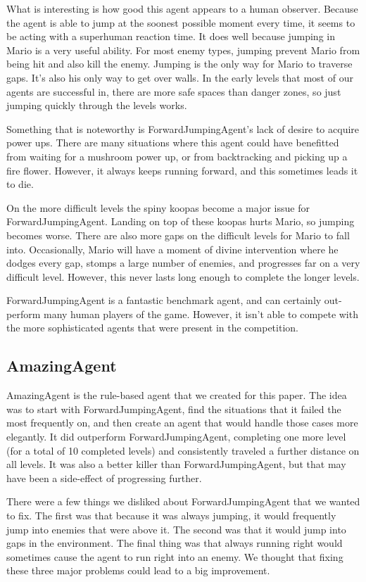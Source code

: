 \documentclass[12pt]{article}
\begin{document}
\begin{multicols*}{2}
What is interesting is how good this agent appears to a human observer.  Because the agent 
is able to jump at the soonest possible moment every time, it seems to be acting with a 
superhuman reaction time.  It does well because jumping in Mario is a very useful ability.  For 
most enemy types, jumping prevent Mario from being hit and also kill the enemy.  Jumping is the 
only way for Mario to traverse gaps.  It's also his only way to get over walls.  In the early levels that 
most of our agents are successful in, there are more safe spaces than danger zones, so just 
jumping quickly through the levels works.

Something that is noteworthy is ForwardJumpingAgent's lack of desire to acquire power ups.  There 
are many situations where this agent could have benefitted from waiting for a mushroom power up, or 
from backtracking and picking up a fire flower.  However, it always keeps running forward, and this 
sometimes leads it to die.

On the more difficult levels the spiny koopas become a major issue for ForwardJumpingAgent.  
Landing on top of these koopas hurts Mario, so jumping becomes worse.  There are also more gaps 
on the difficult levels for Mario to fall into.  Occasionally, Mario will have a moment of divine 
intervention where he dodges every gap, stomps a large number of enemies, and progresses far 
on a very difficult level.  However, this never lasts long enough to complete the longer levels.

ForwardJumpingAgent is a fantastic benchmark agent, and can certainly out-perform many 
human players of the game.  However, it isn't able to compete with the more sophisticated agents 
that were present in the competition.

\subsection*{AmazingAgent}
AmazingAgent is the rule-based agent that we created for this paper.  The idea was to start with 
ForwardJumpingAgent, find the situations that it failed the most frequently on, and then create 
an agent that would handle those cases more elegantly.  It did outperform ForwardJumpingAgent, 
completing one more level (for a total of 10 completed levels) and consistently traveled a further 
distance on all levels.  It was also a better killer than ForwardJumpingAgent, but that may have 
been a side-effect of progressing further.

There were a few things we disliked about ForwardJumpingAgent that we wanted to fix.  The 
first was that because it was always jumping, it would frequently jump into enemies that were above 
it.  The second was that it would jump into gaps in the environment.  The final thing was that always 
running right would sometimes cause the agent to run right into an enemy.  We thought that fixing these 
three major problems could lead to a big improvement.


\end{multicols*}
\end{document}
